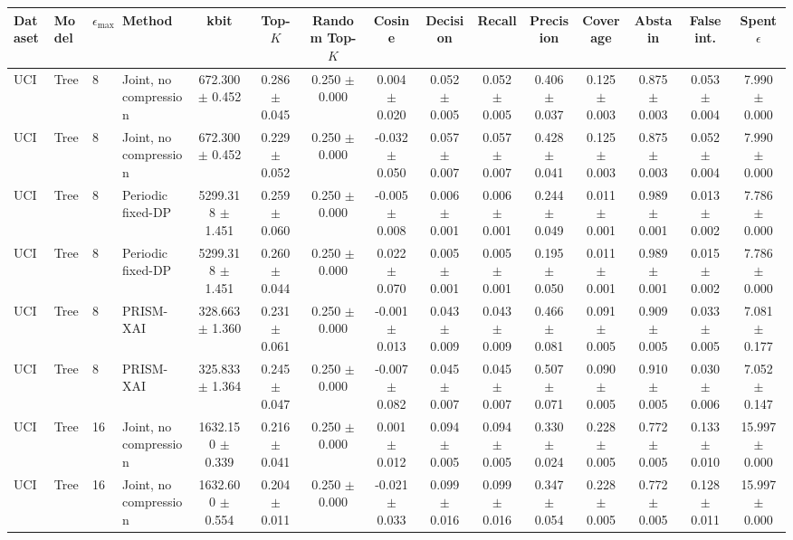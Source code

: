 \begin{tabular}{llllccccccccccc}
\toprule
Dataset & Model & $\epsilon_{\max}$ & Method & kbit & Top-$K$ & Random Top-$K$ & Cosine & Decision & Recall & Precision & Coverage & Abstain & False int. & Spent $\epsilon$ \\
\midrule
UCI & Tree & 8 & Joint, no compression & 672.300 $\pm$ 0.452 & 0.286 $\pm$ 0.045 & 0.250 $\pm$ 0.000 & 0.004 $\pm$ 0.020 & 0.052 $\pm$ 0.005 & 0.052 $\pm$ 0.005 & 0.406 $\pm$ 0.037 & 0.125 $\pm$ 0.003 & 0.875 $\pm$ 0.003 & 0.053 $\pm$ 0.004 & 7.990 $\pm$ 0.000 \\
UCI & Tree & 8 & Joint, no compression & 672.300 $\pm$ 0.452 & 0.229 $\pm$ 0.052 & 0.250 $\pm$ 0.000 & -0.032 $\pm$ 0.050 & 0.057 $\pm$ 0.007 & 0.057 $\pm$ 0.007 & 0.428 $\pm$ 0.041 & 0.125 $\pm$ 0.003 & 0.875 $\pm$ 0.003 & 0.052 $\pm$ 0.004 & 7.990 $\pm$ 0.000 \\
UCI & Tree & 8 & Periodic fixed-DP & 5299.318 $\pm$ 1.451 & 0.259 $\pm$ 0.060 & 0.250 $\pm$ 0.000 & -0.005 $\pm$ 0.008 & 0.006 $\pm$ 0.001 & 0.006 $\pm$ 0.001 & 0.244 $\pm$ 0.049 & 0.011 $\pm$ 0.001 & 0.989 $\pm$ 0.001 & 0.013 $\pm$ 0.002 & 7.786 $\pm$ 0.000 \\
UCI & Tree & 8 & Periodic fixed-DP & 5299.318 $\pm$ 1.451 & 0.260 $\pm$ 0.044 & 0.250 $\pm$ 0.000 & 0.022 $\pm$ 0.070 & 0.005 $\pm$ 0.001 & 0.005 $\pm$ 0.001 & 0.195 $\pm$ 0.050 & 0.011 $\pm$ 0.001 & 0.989 $\pm$ 0.001 & 0.015 $\pm$ 0.002 & 7.786 $\pm$ 0.000 \\
UCI & Tree & 8 & PRISM-XAI & 328.663 $\pm$ 1.360 & 0.231 $\pm$ 0.061 & 0.250 $\pm$ 0.000 & -0.001 $\pm$ 0.013 & 0.043 $\pm$ 0.009 & 0.043 $\pm$ 0.009 & 0.466 $\pm$ 0.081 & 0.091 $\pm$ 0.005 & 0.909 $\pm$ 0.005 & 0.033 $\pm$ 0.005 & 7.081 $\pm$ 0.177 \\
UCI & Tree & 8 & PRISM-XAI & 325.833 $\pm$ 1.364 & 0.245 $\pm$ 0.047 & 0.250 $\pm$ 0.000 & -0.007 $\pm$ 0.082 & 0.045 $\pm$ 0.007 & 0.045 $\pm$ 0.007 & 0.507 $\pm$ 0.071 & 0.090 $\pm$ 0.005 & 0.910 $\pm$ 0.005 & 0.030 $\pm$ 0.006 & 7.052 $\pm$ 0.147 \\
UCI & Tree & 16 & Joint, no compression & 1632.150 $\pm$ 0.339 & 0.216 $\pm$ 0.041 & 0.250 $\pm$ 0.000 & 0.001 $\pm$ 0.012 & 0.094 $\pm$ 0.005 & 0.094 $\pm$ 0.005 & 0.330 $\pm$ 0.024 & 0.228 $\pm$ 0.005 & 0.772 $\pm$ 0.005 & 0.133 $\pm$ 0.010 & 15.997 $\pm$ 0.000 \\
UCI & Tree & 16 & Joint, no compression & 1632.600 $\pm$ 0.554 & 0.204 $\pm$ 0.011 & 0.250 $\pm$ 0.000 & -0.021 $\pm$ 0.033 & 0.099 $\pm$ 0.016 & 0.099 $\pm$ 0.016 & 0.347 $\pm$ 0.054 & 0.228 $\pm$ 0.005 & 0.772 $\pm$ 0.005 & 0.128 $\pm$ 0.011 & 15.997 $\pm$ 0.000 \\

\end{tabular}
